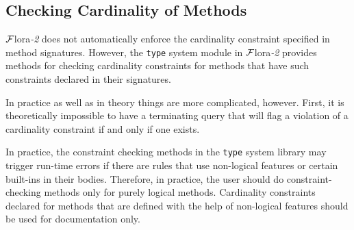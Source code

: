 \documentclass[11pt]{article}
\newcommand{\FLORA}{{\mbox{\sc ${\cal F}${lora}\rm\emph{-2}}}\xspace}
\newcommand{\FLSYSTEM}{\FLORA}
\begin{document}
\subsection{Checking Cardinality of Methods}\label{sec-cardinality}

\FLSYSTEM does not automatically enforce the cardinality constraint specified
in method signatures.  However, the {\tt type} system module in \FLSYSTEM
provides methods for checking cardinality
constraints for methods that have such constraints declared in their
signatures.

In practice as well as in theory things are more complicated, however.
First, it is theoretically impossible to have a terminating
query that will flag a
violation of a cardinality constraint if and only if one exists.

In practice, the constraint checking methods
in the {\tt type} system library may trigger run-time
errors if there are rules that use non-logical features or certain
built-ins
in their bodies.  Therefore, in practice, the user should do
constraint-checking methods only for purely logical methods. Cardinality
constraints declared for methods that are defined with the help of
non-logical features should be used for documentation only.
\end{document}
